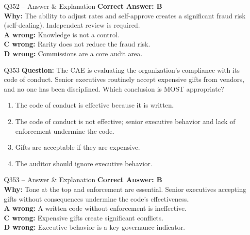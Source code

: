 \documentclass[aspectratio=169,10pt]{beamer}
\begin{document}
	\begin{frame}[t]{Q352 -- Answer \& Explanation}
		\small
		\textbf{Correct Answer: B} \\[4pt]
		\textbf{Why:} The ability to adjust rates and self-approve creates a significant fraud risk (self-dealing). Independent review is required. \\[4pt]
		\textbf{A wrong:} Knowledge is not a control. \\[2pt]
		\textbf{C wrong:} Rarity does not reduce the fraud risk. \\[2pt]
		\textbf{D wrong:} Commissions are a core audit area.
	\end{frame}
	
	\begin{frame}[t]{Q353}
		\small
		\textbf{Question:} The CAE is evaluating the organization's compliance with its code of conduct. Senior executives routinely accept expensive gifts from vendors, and no one has been disciplined. Which conclusion is MOST appropriate?
		\begin{enumerate}[label=\Alph*.,itemsep=1pt,topsep=2pt]
			\item The code of conduct is effective because it is written.
			\item The code of conduct is not effective; senior executive behavior and lack of enforcement undermine the code.
			\item Gifts are acceptable if they are expensive.
			\item The auditor should ignore executive behavior.
		\end{enumerate}
	\end{frame}
	
	\begin{frame}[t]{Q353 -- Answer \& Explanation}
		\small
		\textbf{Correct Answer: B} \\[4pt]
		\textbf{Why:} Tone at the top and enforcement are essential. Senior executives accepting gifts without consequences undermine the code's effectiveness. \\[4pt]
		\textbf{A wrong:} A written code without enforcement is ineffective. \\[2pt]
		\textbf{C wrong:} Expensive gifts create significant conflicts. \\[2pt]
		\textbf{D wrong:} Executive behavior is a key governance indicator.
	\end{frame}
	
\end{document}
